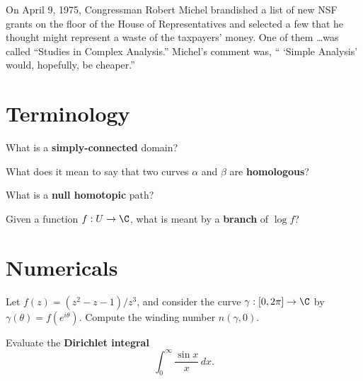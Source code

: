 \documentclass{homework}
\author{Jim Fowler}
\begin{document}
\maketitle

\begin{inspiration}
  On April 9, 1975, Congressman Robert Michel brandished a list of new
  NSF grants on the floor of the House of Representatives and selected
  a few that he thought might represent a waste of the taxpayers'
  money. One of them \ldots was called ``Studies in Complex
  Analysis.'' Michel's comment was, `` `Simple Analysis' would,
  hopefully, be cheaper.''
\end{inspiration}

\section{Terminology}

\begin{problem}
  What is a \textbf{simply-connected} domain?
\end{problem}

\begin{problem}
  What does it mean to say that two curves $\alpha$ and $\beta$ are
  \textbf{homologous}?
\end{problem}

\begin{problem}
  What is a \textbf{null homotopic} path?
\end{problem}

\begin{problem}
  Given a function $f : U \to \C$, what is meant by a \textbf{branch} of $\log f$?
\end{problem}

\section{Numericals}

\begin{problem}
  Let $f(z) = (z^2-z-1)/z^3$, and consider the curve
  $\gamma : [0,2\pi] \to \C$ by $\gamma(\theta) = f(e^{i\theta})$.
  Compute the winding number $n(\gamma,0)$.
\end{problem}

\begin{problem}
  Evaluate the \textbf{Dirichlet integral}
  \[
    \int_0^\infty \frac{\sin x}{x} \, dx.
  \]
\end{problem}
\end{document}
